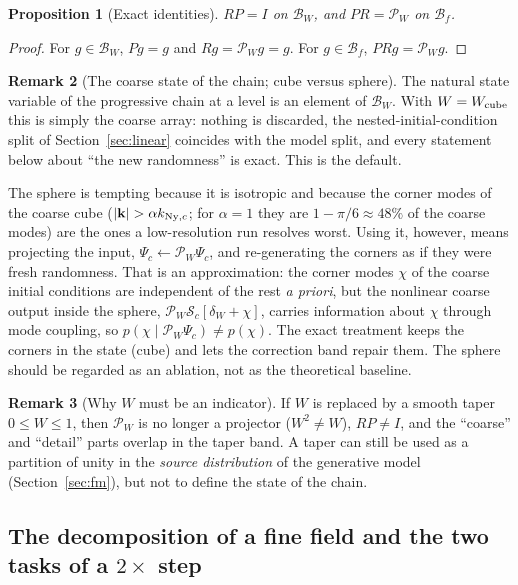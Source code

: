 \documentclass[11pt]{article}
\newtheorem{proposition}{Proposition}[section]
\theoremstyle{definition}
\newtheorem{remark}[proposition]{Remark}
\newcommand{\kk}{\mathbf{k}}
\newcommand{\Psic}{\Psi_{c}}
\newcommand{\PW}{\mathcal{P}_W}
\newcommand{\Bf}{\mathcal{B}_f}
\newcommand{\BW}{\mathcal{B}_W}
\newcommand{\Ny}{{\rm Ny}}
\newcommand{\Nbody}{\mathcal{S}}
\begin{document}
\begin{proposition}[Exact identities]\label{prop:RP}
$RP=I$ on $\BW$, and $PR=\PW$ on $\Bf$.
\end{proposition}
\begin{proof}
For $g\in\BW$, $Pg=g$ and $R g=\PW g=g$. For $g\in\Bf$, $PRg=\PW g$.
\end{proof}

\begin{remark}[The coarse state of the chain; cube versus sphere]\label{rem:clean}
The natural state variable of the progressive chain at a level is an element of $\BW$. With $W=W_{\rm cube}$ this is simply the coarse array: nothing is discarded, the nested-initial-condition split of Section~\ref{sec:linear} coincides with the model split, and every statement below about ``the new randomness'' is exact. This is the default.

The sphere is tempting because it is isotropic and because the corner modes of the coarse cube ($|\kk|>\alpha k_{\Ny,c}$; for $\alpha=1$ they are $1-\pi/6\approx48\%$ of the coarse modes) are the ones a low-resolution run resolves worst. Using it, however, means projecting the input, $\Psic\leftarrow\PW\Psic$, and re-generating the corners as if they were fresh randomness. That is an approximation: the corner modes $\chi$ of the coarse initial conditions are independent of the rest \emph{a priori}, but the nonlinear coarse output inside the sphere, $\PW\Nbody_c[\delta_W+\chi]$, carries information about $\chi$ through mode coupling, so $p(\chi\mid\PW\Psic)\neq p(\chi)$. The exact treatment keeps the corners in the state (cube) and lets the correction band repair them. The sphere should be regarded as an ablation, not as the theoretical baseline.
\end{remark}

\begin{remark}[Why $W$ must be an indicator]
If $W$ is replaced by a smooth taper $0\le W\le1$, then $\PW$ is no longer a projector ($W^2\neq W$), $RP\neq I$, and the ``coarse'' and ``detail'' parts overlap in the taper band. A taper can still be used as a partition of unity in the \emph{source distribution} of the generative model (Section~\ref{sec:fm}), but not to define the state of the chain.
\end{remark}

\subsection{The decomposition of a fine field and the two tasks of a $2\times$ step}
\end{document}
